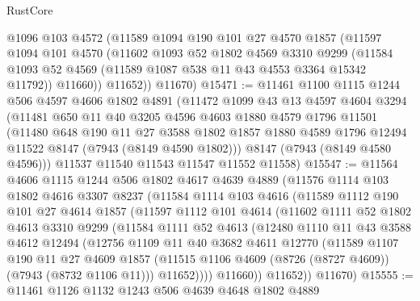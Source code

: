 \begin{lexlean}{RustCore}
\begin{coremodule}
        @1096
        @103
        @4572
        (@11589
          @1094
          @190
          @101
          @27
          @4570
          @1857
          (@11597
            @1094
            @101
            @4570
            (@11602
              @1093
              @52
              @1802
              @4569
              @3310
              @9299
              (@11584 @1093 @52 @4569 (@11589 @1087 @538 @11 @43 @4553 @3364 @15342 @11792))
              @11660))
          @11652))
      @11670)
@15471 := @11461
    @1100
    @1115
    @1244
    @506
    @4597
    @4606
    @1802
    @4891
    (@11472
      @1099
      @43
      @13
      @4597
      @4604
      @3294
      (@11481
        @650
        @11
        @40
        @3205
        @4596
        @4603
        @1880
        @4579
        @1796
        @11501
        (@11480
          @648
          @190
          @11
          @27
          @3588
          @1802
          @1857
          @1880
          @4589
          @1796
          @12494
          @11522
          @8147
          (@7943 (@8149 @4590 @1802)))
        @8147
        (@7943 (@8149 @4580 @4596)))
      @11537
      @11540
      @11543
      @11547
      @11552
      @11558)
@15547 := @11564
    @4606
    @1115
    @1244
    @506
    @1802
    @4617
    @4639
    @4889
    (@11576
      @1114
      @103
      @1802
      @4616
      @3307
      @8237
      (@11584
        @1114
        @103
        @4616
        (@11589
          @1112
          @190
          @101
          @27
          @4614
          @1857
          (@11597
            @1112
            @101
            @4614
            (@11602
              @1111
              @52
              @1802
              @4613
              @3310
              @9299
              (@11584
                @1111
                @52
                @4613
                (@12480
                  @1110
                  @11
                  @43
                  @3588
                  @4612
                  @12494
                  (@12756
                    @1109
                    @11
                    @40
                    @3682
                    @4611
                    @12770
                    (@11589
                      @1107
                      @190
                      @11
                      @27
                      @4609
                      @1857
                      (@11515 @1106 @4609 (@8726 (@8727 @4609)) (@7943 (@8732 @1106 @11)))
                      @11652))))
              @11660))
          @11652))
      @11670)
@15555 := @11461 @1126 @1132 @1243 @506 @4639 @4648 @1802 @4889

\end{coremodule}
\end{lexlean}
